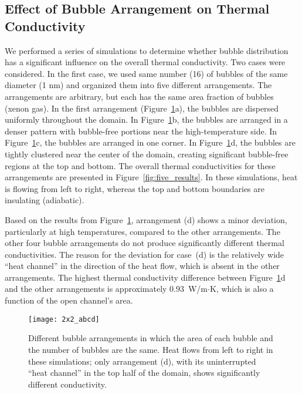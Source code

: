 \subsection{Effect of Bubble Arrangement on Thermal Conductivity}
\label{subsec:area}
We performed a series of simulations to determine whether bubble distribution has a significant influence on the overall thermal conductivity. Two cases were considered. In the first case, we used same number (16) of bubbles of the same diameter (1 nm) and organized them into five different arrangements. The arrangements are arbitrary, but each has the same area fraction of bubbles (xenon gas). In the first arrangement (Figure~\ref{fig:five_figures}a), the bubbles are dispersed uniformly throughout the domain. In Figure~\ref{fig:five_figures}b, the bubbles are arranged in a denser pattern with bubble-free portions near the high-temperature side. In Figure~\ref{fig:five_figures}c, the bubbles are arranged in one corner. In Figure~\ref{fig:five_figures}d, the bubbles are tightly clustered near the center of the domain, creating significant bubble-free regions at the top and bottom. The overall thermal conductivities for these arrangements are presented in Figure~\ref{fig:five_results}.
In these simulations, heat is flowing from left to right, whereas the top and bottom boundaries are insulating (adiabatic).

Based on the results from Figure~\ref{fig:five_figures}, arrangement (d) shows a minor deviation, particularly at high temperatures, compared to the other arrangements. The other four bubble arrangements do not produce significantly different thermal conductivities. The reason for the deviation for case~(d) is the relatively wide ``heat channel'' in the direction of the heat flow, which is absent in the other arrangements. The highest thermal conductivity difference between Figure~\ref{fig:five_figures}d and the other arrangements is approximately 0.93~W/m$\cdot$K, which is also a function of the open channel's area.

\begin{figure}
	\centering
	\texttt{[image: 2x2\_abcd]}
    \caption[Different bubble arrangements in which the area of each bubble and
      the number of bubbles are the same]{Different bubble arrangements in which the area of each bubble and
      the number of bubbles are the same. Heat flows from left to right in
      these simulations; only arrangement (d), with its uninterrupted ``heat
      channel'' in the top half of the domain, shows significantly different
      conductivity.}
	\label{fig:five_figures} 
\end{figure}

